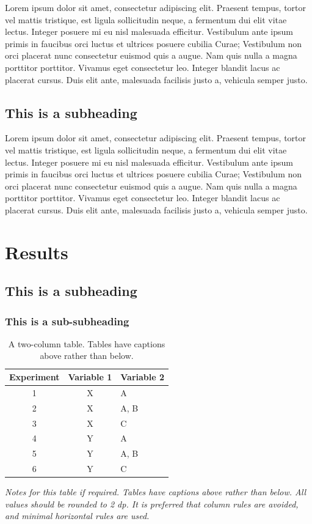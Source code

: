 \documentclass[paper=a4,fontsize=11pt,twocolumn]{article}
\begin{document}
Lorem ipsum dolor sit amet, consectetur adipiscing elit. Praesent tempus, tortor vel mattis tristique, est ligula sollicitudin neque, a fermentum dui elit vitae lectus. Integer posuere mi eu nisl malesuada efficitur. Vestibulum ante ipsum primis in faucibus orci luctus et ultrices posuere cubilia Curae; Vestibulum non orci placerat nunc consectetur euismod quis a augue. Nam quis nulla a magna porttitor porttitor. Vivamus eget consectetur leo. Integer blandit lacus ac placerat cursus. Duis elit ante, malesuada facilisis justo a, vehicula semper justo. 

\subsection{This is a subheading}
Lorem ipsum dolor sit amet, consectetur adipiscing elit. Praesent tempus, tortor vel mattis tristique, est ligula sollicitudin neque, a fermentum dui elit vitae lectus. Integer posuere mi eu nisl malesuada efficitur. Vestibulum ante ipsum primis in faucibus orci luctus et ultrices posuere cubilia Curae; Vestibulum non orci placerat nunc consectetur euismod quis a augue. Nam quis nulla a magna porttitor porttitor. Vivamus eget consectetur leo. Integer blandit lacus ac placerat cursus. Duis elit ante, malesuada facilisis justo a, vehicula semper justo. 

\section{Results}

\subsection{This is a subheading}

\subsubsection{This is a sub-subheading}

\begin{table}
\begin{centering}
\caption{A two-column table. Tables have captions above rather than below.}\label{tab:one-column}
	\begin{tabular}[\columnwidth]{ccl}\toprule
		Experiment &  Variable 1 &  Variable 2 \\
		\midrule
		1  & X & A \\
		2  & X & A, B \\
		3  & X & C \\
		4  & Y & A \\
		5  & Y & A, B \\
		6  & Y & C \\
		\bottomrule
	\end{tabular}\par
	\medskip
\textit{Notes for this table if required. Tables have captions above rather than below. All values should be rounded to 2 dp. It is preferred that column rules are avoided, and minimal horizontal rules are used.}\end{centering}
\end{table}
\end{document}
